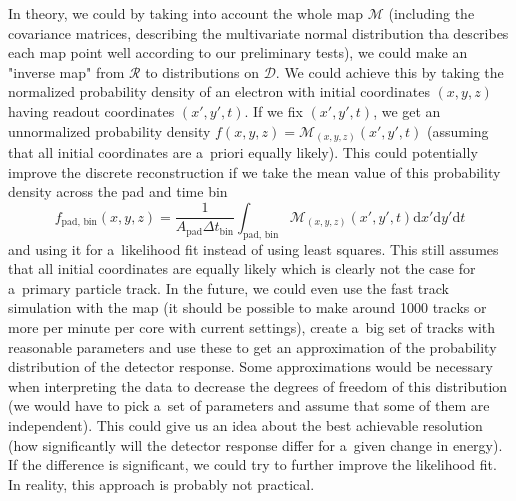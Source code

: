 \begin{itemize}
			In theory, we could by taking into account the whole map $\mathcal{M}$ (including the covariance matrices, describing the multivariate normal distribution tha describes each map point well according to our preliminary tests), we could make an "inverse map" from $\mathcal{R}$ to distributions on $\mathcal{D}$. We could achieve this by taking the normalized probability density of an electron with initial coordinates $(x,y,z)$ having readout coordinates $(x',y',t)$. If we fix $(x',y',t)$, we get an unnormalized probability density $f(x,y,z) = \mathcal{M}_{(x,y,z)}(x',y',t)$ (assuming that all initial coordinates are a~priori equally likely). This could potentially improve the discrete reconstruction if we take the mean value of this probability density across the pad and time bin
			\begin{equation}
				f_\text{pad, bin}(x,y,z) = \frac{1}{A_\text{pad} \Delta t_\text{bin}} \int_\text{pad, bin} \mathcal{M}_{(x,y,z)}(x',y',t) 	\text{d}x'\text{d}y'\text{d}t
			\end{equation}
			and using it for a~likelihood fit instead of using least squares. This still assumes that all initial coordinates are equally likely which is clearly not the case for a~primary particle track. In the future, we could even use the fast track simulation with the map (it should be possible to make around 1000 tracks or more per minute per core with current settings), create a~big set of tracks with reasonable parameters and use these to get an approximation of the probability distribution of the detector response. Some approximations would be necessary when interpreting the data to decrease the degrees of freedom of this distribution (we would have to pick a~set of parameters and assume that some of them are independent). This could give us an idea about the best achievable resolution (how significantly will the detector response differ for a~given change in energy). If the difference is significant, we could try to further improve the likelihood fit. In reality, this approach is probably not practical.
		\end{itemize}
			
